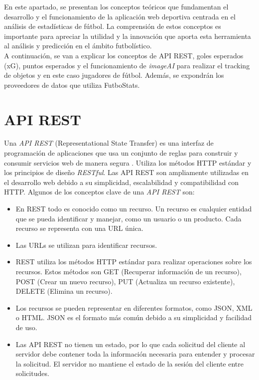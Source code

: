 
En este apartado, se presentan los conceptos teóricos que fundamentan el desarrollo y el funcionamiento de la aplicación web deportiva centrada en el análisis de estadísticas de fútbol. La comprensión de estos conceptos es importante para apreciar la utilidad y la innovación que aporta esta herramienta al análisis y predicción en el ámbito futbolístico. \\
A continuación, se van a explicar los conceptos de API REST, goles esperados (xG), puntos esperados y el funcionamiento de \textit{imageAI} para realizar el tracking de objetos y en este caso jugadores de fútbol.
Además, se expondrán los proveedores de datos que utiliza FutboStats.

\section{API REST}
Una \textit{API REST} (Representational State Transfer) es una interfaz de programación de aplicaciones que usa un conjunto de reglas para construir y consumir servicios web de manera segura \cite{apiRest}. Utiliza los métodos HTTP estándar y los principios de diseño \textit{RESTful}. Las API REST son ampliamente utilizadas en el desarrollo web debido a su simplicidad, escalabilidad y compatibilidad con HTTP.
Algunos de los conceptos clave de una \textit{API REST} son:
\begin{itemize}
    \item En REST todo es conocido como un recurso. Un recurso es cualquier entidad que se pueda identificar y manejar, como un usuario o un producto. Cada recurso se representa con una URL única.
    \item Las URLs se utilizan para identificar recursos.
    \item REST utiliza los métodos HTTP estándar para realizar operaciones sobre los recursos. Estos métodos son GET (Recuperar información de un recurso), POST (Crear un nuevo recurso), PUT (Actualiza un recurso existente), DELETE (Elimina un recurso).
    \item Los recursos se pueden representar en diferentes formatos, como JSON, XML o HTML. JSON es el formato más común debido a su simplicidad  y facilidad de uso.
    \item Las API REST no tienen un estado, por lo que cada solicitud del cliente al servidor debe contener toda la información necesaria para entender y procesar la solicitud. El servidor no mantiene el estado de la sesión del cliente entre solicitudes.
\end{itemize}

